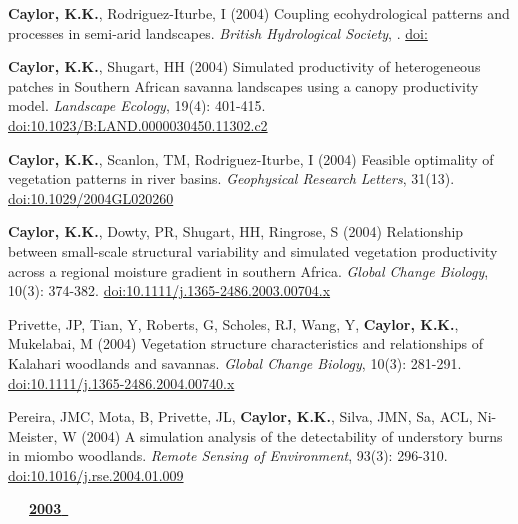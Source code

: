 \begin{etaremune}
\item \textbf{ Caylor, K.K.}, Rodriguez-Iturbe, I (2004) Coupling ecohydrological patterns and processes in semi-arid landscapes. \emph{British Hydrological Society}, . \href{https://doi.org/}{doi:}
\item \textbf{ Caylor, K.K.}, Shugart, HH (2004) Simulated productivity of heterogeneous patches in Southern African savanna landscapes using a canopy productivity model. \emph{Landscape Ecology}, 19(4): 401-415. \href{https://doi.org/10.1023/B:LAND.0000030450.11302.c2}{doi:10.1023/B:LAND.0000030450.11302.c2}
\item \textbf{ Caylor, K.K.}, Scanlon, TM, Rodriguez-Iturbe, I (2004) Feasible optimality of vegetation patterns in river basins. \emph{Geophysical Research Letters}, 31(13). \href{https://doi.org/10.1029/2004GL020260}{doi:10.1029/2004GL020260}
\item \textbf{ Caylor, K.K.}, Dowty, PR, Shugart, HH, Ringrose, S (2004) Relationship between small-scale structural variability and simulated vegetation productivity across a regional moisture gradient in southern Africa. \emph{Global Change Biology}, 10(3): 374-382. \href{https://doi.org/10.1111/j.1365-2486.2003.00704.x}{doi:10.1111/j.1365-2486.2003.00704.x}
\item Privette, JP, Tian, Y, Roberts, G, Scholes, RJ, Wang, Y, \textbf{ Caylor, K.K.}, Mukelabai, M (2004) Vegetation structure characteristics and relationships of Kalahari woodlands and savannas. \emph{Global Change Biology}, 10(3): 281-291. \href{https://doi.org/10.1111/j.1365-2486.2004.00740.x}{doi:10.1111/j.1365-2486.2004.00740.x}
\item Pereira, JMC, Mota, B, Privette, JL, \textbf{ Caylor, K.K.}, Silva, JMN, Sa, ACL, Ni-Meister, W (2004) A  simulation analysis of the detectability of understory burns in miombo woodlands. \emph{Remote Sensing of Environment}, 93(3): 296-310. \href{https://doi.org/10.1016/j.rse.2004.01.009}{doi:10.1016/j.rse.2004.01.009}

\vspace{0.1in}
\mbox{\ \ \ \underline{\textbf{2003 }}}
\vspace{0.1in}


\end{etaremune}
